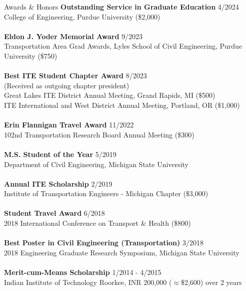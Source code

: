 \documentclass{CV} %
\begin{document}
\begin{rSection}{Awards \& Honors}%
    \textbf{Outstanding Service in Graduate Education} \hfill {4/2024}
    \\ College of Engineering, Purdue University (\$2,000) \\
    \\ \textbf{Eldon J. Yoder Memorial Award} \hfill {9/2023}
    \\ Transportation Area Grad Awards, Lyles School of Civil Engineering, Purdue University (\$750) \\
    \\ \textbf{Best ITE Student Chapter Award} \hfill {8/2023}
    \\ (Received as outgoing chapter president)
    \\ Great Lakes ITE District Annual Meeting, Grand Rapids, MI (\$500)
    \\ ITE International and West District Annual Meeting, Portland, OR (\$1,000) \\
    \\ \textbf{Erin Flannigan Travel Award} \hfill {11/2022}
    \\ 102nd Transportation Research Board Annual Meeting (\$300) \\
    \\ \textbf{M.S. Student of the Year} \hfill {5/2019}
    \\ Department of Civil Engineering, Michigan State University \\
    \\ \textbf{Annual ITE Scholarship} \hfill {2/2019}
    \\ Institute of Transportation Engineers - Michigan Chapter (\$3,000) \\
    \\ \textbf{Student Travel Award} \hfill {6/2018}
    \\ 2018 International Conference on Transport \& Health (\$800) \\
    \\ \textbf{Best Poster in Civil Engineering (Transportation)} \hfill{3/2018}
    \\ 2018 Engineering Graduate Research Symposium, Michigan State University \\
    \\ \textbf{Merit-cum-Means Scholarship} \hfill{1/2014 - 4/2015}
    \\ Indian Institute of Technology Roorkee, INR 200,000 ($\approx$\$2,600) over 2 years
\end{rSection}
\end{document}
